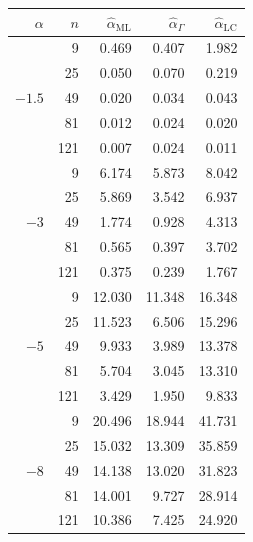 \documentclass[10pt,a4paper]{article}
\begin{document}
\vspace{1cm}

\begin{minipage}{0.5\linewidth}
\begin{tabular}{rrrrr}
	\toprule
	$\alpha$ & $n$ & $\widehat{\alpha}_{\text{ML}}$ & $\widehat{\alpha}_{\Gamma}$ & $\widehat{\alpha}_{\text{LC}}$\\
	\midrule
	\multirow{5 }{*}{$-1.5$}
	& 9 & 0.469 & 0.407 & 1.982 \\ 
	& 25 & 0.050 & 0.070 & 0.219 \\ 
	& 49 & 0.020 & 0.034 & 0.043 \\ 
	& 81 & 0.012 & 0.024 & 0.020 \\ 
	& 121 & 0.007 & 0.024 & 0.011 \\
	\midrule
	\multirow{5 }{*}{$-3$}
	& 9 & 6.174 & 5.873 & 8.042 \\ 
	& 25 & 5.869 & 3.542 & 6.937 \\ 
	& 49 & 1.774 & 0.928 & 4.313 \\ 
	& 81 & 0.565 & 0.397 & 3.702 \\ 
	& 121 & 0.375 & 0.239 & 1.767 \\
	\midrule
	\multirow{5 }{*}{$-5$} 
	& 9 & 12.030 & 11.348 & 16.348 \\ 
	& 25 & 11.523 & 6.506 & 15.296 \\ 
	& 49 & 9.933 & 3.989 & 13.378 \\ 
	& 81 & 5.704 & 3.045 & 13.310 \\ 
	& 121 & 3.429 & 1.950 & 9.833 \\
	\midrule
	\multirow{5 }{*}{$-8$} 
	& 9 & 20.496 & 18.944 & 41.731 \\ 
	& 25 & 15.032 & 13.309 & 35.859 \\ 
	& 49 & 14.138 & 13.020 & 31.823 \\ 
	& 81 & 14.001 & 9.727 & 28.914 \\ 
	& 121 & 10.386 & 7.425 & 24.920 \\ 
	\bottomrule
\end{tabular}
\end{minipage}
\;
\end{document}
